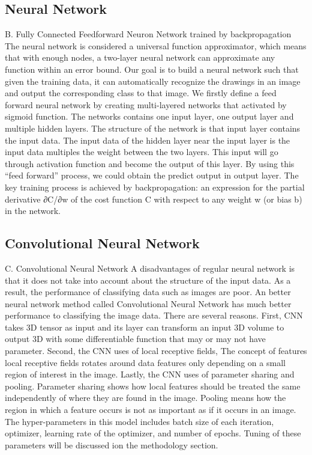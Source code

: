 \documentclass[conference]{IEEEtran}
\begin{document}
\subsection{Neural Network}
B. Fully Connected Feedforward Neuron Network  trained by backpropagation
The neural network is considered a universal function approximator, which means that with enough nodes, a two-layer neural network can approximate any function within an error bound. Our goal is to build a neural network such that given the training data, it can automatically recognize the drawings in an image and output the corresponding class to that image. 
We firstly define a feed forward neural network by creating multi-layered networks that activated  by sigmoid function. The networks contains one input layer, one output layer and multiple hidden layers. 
The structure of the network is that input layer contains the input data. The input data of the hidden layer near the input layer is the input data multiples the weight between the two layers. This input will go through activation function and become the output of this layer. By using this “feed forward” process, we could obtain the predict output in output layer.
The key training process is achieved by backpropagation:  an expression for the partial derivative ∂C/∂w of the cost function C with respect to any weight w (or bias b) in the network. 

\subsection{Convolutional Neural Network}
C. Convolutional Neural Network  
A disadvantages of regular neural network is that it does not take into account about the structure of the input data. As a result, the performance of classifying data such as images are poor. 
An better neural network method called Convolutional Neural Network has much better performance to classifying the image data. There are several reasons.
First, CNN takes 3D tensor as input and its layer can transform an input 3D volume to output 3D with some differentiable function that may or may not have parameter. 
Second, the CNN uses of local receptive fields, The concept of features local receptive fields rotates around data features only depending on a small region of interest in the image. 
Lastly, the CNN uses of  parameter sharing and pooling. Parameter sharing shows how local features should be treated the same independently of where they are found in the image. Pooling means how the region in which a feature occurs is not as important as if it occurs in an image. 
The hyper-parameters in this model includes batch size of each iteration, optimizer, learning rate of the optimizer, and number of epochs. Tuning of these parameters will be discussed ion the methodology section.
\end{document}
